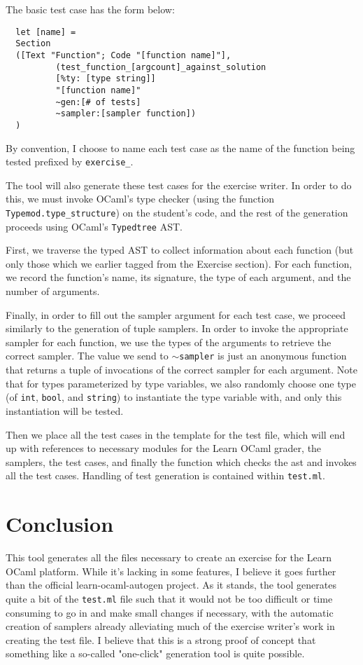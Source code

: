 \documentclass[11pt]{article}
\begin{document}
The basic test case has the form below:

\begin{lstlisting}
  let [name] =
  Section
  ([Text "Function"; Code "[function name]"],
          (test_function_[argcount]_against_solution
          [%ty: [type string]]
          "[function name]"
          ~gen:[# of tests]
          ~sampler:[sampler function])
  )
\end{lstlisting}

By convention, I choose to name each test case as the name of the function being tested prefixed by \verb+exercise_+. 

The tool will also generate these test cases for the exercise writer. In order to do this, we must invoke OCaml's type checker (using the function \verb+Typemod.type_structure+) on the student's code, and the rest of the generation proceeds using OCaml's \verb+Typedtree+ AST.

First, we traverse the typed AST to collect information about each function (but only those which we earlier tagged from the Exercise section). For each function, we record the function's name, its signature, the type of each argument, and the number of arguments.

Finally, in order to fill out the sampler argument for each test case, we proceed similarly to the generation of tuple samplers. In order to invoke the appropriate sampler for each function, we use the types of the arguments to retrieve the correct sampler. The value we send to $\sim$\verb+sampler+ is just an anonymous function that returns a tuple of invocations of the correct sampler for each argument. Note that for types parameterized by type variables, we also randomly choose one type (of \verb+int+, \verb+bool+, and \verb+string+) to instantiate the type variable with, and only this instantiation will be tested.

Then we place all the test cases in the template for the test file, which will end up with references to necessary modules for the Learn OCaml grader, the samplers, the test cases, and finally the function which checks the ast and invokes all the test cases. Handling of test generation is contained within \verb+test.ml+.

\section{Conclusion}
This tool generates all the files necessary to create an exercise for the Learn OCaml platform. While it's lacking in some features, I believe it goes further than the official learn-ocaml-autogen project. As it stands, the tool generates quite a bit of the \verb+test.ml+ file such that it would not be too difficult or time consuming to go in and make small changes if necessary, with the automatic creation of samplers already alleviating much of the exercise writer's work in creating the test file. I believe that this is a strong proof of concept that something like a so-called "one-click" generation tool is quite possible.
\end{document}
